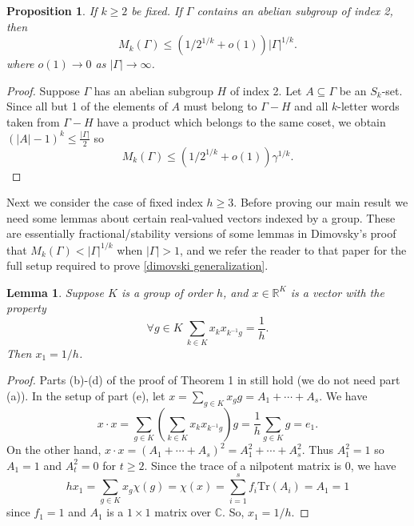 \documentclass[12pt]{article}
\newtheorem{lemma}{Lemma}
\newtheorem{prop}{Proposition}
\begin{document}
\begin{prop}
    If $k\ge 2$ be fixed. If $\Gamma$ contains an abelian subgroup of index 2, then
$$M_k(\Gamma)\le(1/2^{1/k}+o(1))|\Gamma|^{1/k}.$$
    where $o(1)\to 0$ as $|\Gamma|\to\infty$.
\end{prop}
\begin{proof}
Suppose $\Gamma$ has an abelian subgroup $H$ of index 2. Let $A\subseteq\Gamma$ be an $S_k$-set. Since all but 1 of the elements of $A$ must belong to $\Gamma-H$ and all $k$-letter words taken from $\Gamma-H$ have a product which belongs to the same coset, we obtain
$(|A|-1)^k\le\frac{|\Gamma|}{2}$ so
$$M_k(\Gamma)\le(1/2^{1/k}+o(1))\gamma^{1/k}.$$
\end{proof}

Next we consider the case of fixed index $h\ge 3$. Before proving our main result we need some lemmas about certain real-valued vectors indexed by a group. These are essentially fractional/stability versions of some lemmas in Dimovsky's proof \cite{dimovski1992groups} that $M_k(\Gamma)<|\Gamma|^{1/k}$ when $|\Gamma|>1$, and we refer the reader to that paper for the full setup required to prove \autoref{dimovski generalization}. 

\begin{lemma} \label{dimovski generalization}
    Suppose $K$ is a group of order $h$, and $x\in\mathbb R^K$ is a vector with the property
    $$\forall g\in K\ \sum_{k\in K}x_kx_{k^{-1}g}=\frac{1}{h}.$$
    Then $x_1=1/h$.
\end{lemma}
\begin{proof}
    Parts (b)-(d) of the proof of Theorem 1 in \cite{dimovski1992groups} still hold (we do not need part (a)). In the setup of part (e), let $x=\sum_{g\in K}x_gg=A_1+\cdots+A_s$. We have
    $$x\cdot x=\sum_{g\in K}\left(\sum_{k\in K}x_kx_{k^{-1}g}\right)g=\frac{1}{h}\sum_{g\in K}g=e_1.$$
    On the other hand, $x\cdot x=(A_1+\cdots+A_s)^2=A_1^2+\cdots+A_s^2$. Thus $A_1^2=1$ so $
A_1=1$ and $A_t^2=0$ for $t\ge 2$. Since the trace of a nilpotent matrix is 0, we have
    $$hx_1=\sum_{g\in K}x_g\chi(g)=\chi(x)=\sum_{i=1}^sf_i\mathrm{Tr}(A_i)=A_1=1$$
    since $f_1=1$ and $A_1$ is a $1\times 1$ matrix over $\mathbb C$. So, $x_1=1/h$.
\end{proof}
\end{document}
